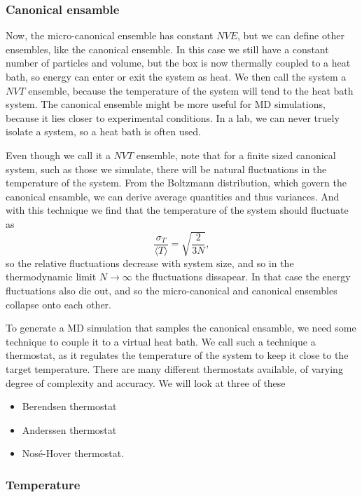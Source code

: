 \documentclass[a4paper, 11pt, notitlepage, english]{article}
\begin{document}
\subsubsection*{Canonical ensamble}

Now, the micro-canonical ensemble has constant $NVE$, but we can define other ensembles, like the canonical ensemble. In this case we still have a constant number of particles and volume, but the box is now thermally coupled to a heat bath, so energy can enter or exit the system as heat. We then call the system a $NVT$ ensemble, because the temperature of the system will tend to the heat bath system. The canonical ensemble might be more useful for MD simulations, because it lies closer to experimental conditions. In a lab, we can never truely isolate a system, so a heat bath is often used.

Even though we call it a $NVT$ ensemble, note that for a finite sized canonical system, such as those we simulate, there will be natural fluctuations in the temperature of the system. From the Boltzmann distribution, which govern the canonical ensamble, we can derive average quantities and thus variances. And with this technique we find that the temperature of the system should fluctuate as
$$\frac{\sigma_T}{\langle T \rangle} = \sqrt{\frac{2}{3N}},$$
so the relative fluctuations decrease with system size, and so in the thermodynamic limit $N\to \infty$ the fluctuations dissapear. In that case the energy fluctuations also die out, and so the micro-canonical and canonical ensembles collapse onto each other.

To generate a MD simulation that samples the canonical ensamble, we need some technique to couple it to a virtual heat bath. We call such a technique a thermostat, as it regulates the temperature of the system to keep it close to the target temperature. There are many different thermostats available, of varying degree of complexity and accuracy. We will look at three of these
\begin{itemize}
	\item Berendsen thermostat
	\item Anderssen thermostat
	\item Nosé-Hover thermostat.
\end{itemize}

\subsubsection*{Temperature}
\end{document}
